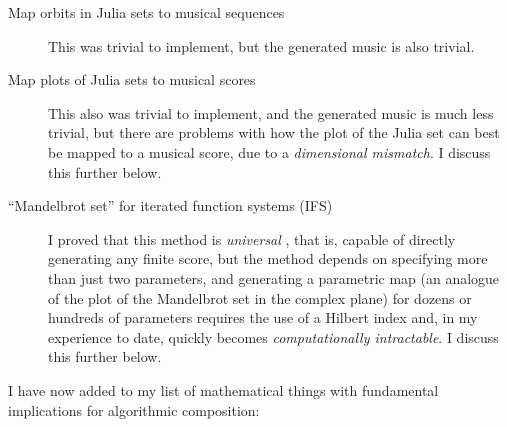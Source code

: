 \documentclass[11pt]{scrartcl}
\begin{document}
\begin{description}
\item[Map orbits in Julia sets to musical sequences] This was trivial to implement, but the generated music is also trivial.
\item[Map plots of Julia sets to musical scores] This also was trivial to implement, and the generated music is much less trivial, but there are problems with how the plot of the Julia set can best be mapped to a musical score, due to a \emph{dimensional mismatch}. I discuss this further below.
\item[``Mandelbrot set'' for iterated function systems (IFS)] I proved that this method is \emph{universal} \cite{obsessed, gogins2023scoregraphs}, that is, capable of directly generating any finite score, but the method depends on specifying more than just two parameters, and generating a parametric map (an analogue of the plot of the Mandelbrot set in the complex plane) for dozens or hundreds of parameters requires the use of a Hilbert index  \cite{hamilton2007compact} and, in my experience to date, quickly becomes \emph{computationally intractable}. I discuss this further below.
\end{description}

I have now added to my list of mathematical things with fundamental implications for algorithmic composition:
\end{document}
